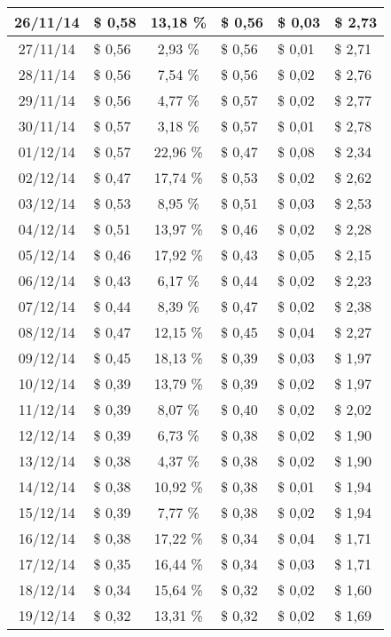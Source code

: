 \begin{center}
\begin{small}
\begin{longtable}{|c|l|c|l|l|l|}
26/11/14 & \$ 0,58 & 13,18 \% & \$ 0,56 & \$ 0,03 & \$ 2,73 \\ \hline
27/11/14 & \$ 0,56 & 2,93 \% & \$ 0,56 & \$ 0,01 & \$ 2,71 \\ \hline
28/11/14 & \$ 0,56 & 7,54 \% & \$ 0,56 & \$ 0,02 & \$ 2,76 \\ \hline
29/11/14 & \$ 0,56 & 4,77 \% & \$ 0,57 & \$ 0,02 & \$ 2,77 \\ \hline
30/11/14 & \$ 0,57 & 3,18 \% & \$ 0,57 & \$ 0,01 & \$ 2,78 \\ \hline
01/12/14 & \$ 0,57 & 22,96 \% & \$ 0,47 & \$ 0,08 & \$ 2,34 \\ \hline
02/12/14 & \$ 0,47 & 17,74 \% & \$ 0,53 & \$ 0,02 & \$ 2,62 \\ \hline
03/12/14 & \$ 0,53 & 8,95 \% & \$ 0,51 & \$ 0,03 & \$ 2,53 \\ \hline
04/12/14 & \$ 0,51 & 13,97 \% & \$ 0,46 & \$ 0,02 & \$ 2,28 \\ \hline
05/12/14 & \$ 0,46 & 17,92 \% & \$ 0,43 & \$ 0,05 & \$ 2,15 \\ \hline
06/12/14 & \$ 0,43 & 6,17 \% & \$ 0,44 & \$ 0,02 & \$ 2,23 \\ \hline
07/12/14 & \$ 0,44 & 8,39 \% & \$ 0,47 & \$ 0,02 & \$ 2,38 \\ \hline
08/12/14 & \$ 0,47 & 12,15 \% & \$ 0,45 & \$ 0,04 & \$ 2,27 \\ \hline
09/12/14 & \$ 0,45 & 18,13 \% & \$ 0,39 & \$ 0,03 & \$ 1,97 \\ \hline
10/12/14 & \$ 0,39 & 13,79 \% & \$ 0,39 & \$ 0,02 & \$ 1,97 \\ \hline
11/12/14 & \$ 0,39 & 8,07 \% & \$ 0,40 & \$ 0,02 & \$ 2,02 \\ \hline
12/12/14 & \$ 0,39 & 6,73 \% & \$ 0,38 & \$ 0,02 & \$ 1,90 \\ \hline
13/12/14 & \$ 0,38 & 4,37 \% & \$ 0,38 & \$ 0,02 & \$ 1,90 \\ \hline
14/12/14 & \$ 0,38 & 10,92 \% & \$ 0,38 & \$ 0,01 & \$ 1,94 \\ \hline
15/12/14 & \$ 0,39 & 7,77 \% & \$ 0,38 & \$ 0,02 & \$ 1,94 \\ \hline
16/12/14 & \$ 0,38 & 17,22 \% & \$ 0,34 & \$ 0,04 & \$ 1,71 \\ \hline
17/12/14 & \$ 0,35 & 16,44 \% & \$ 0,34 & \$ 0,03 & \$ 1,71 \\ \hline
18/12/14 & \$ 0,34 & 15,64 \% & \$ 0,32 & \$ 0,02 & \$ 1,60 \\ \hline
19/12/14 & \$ 0,32 & 13,31 \% & \$ 0,32 & \$ 0,02 & \$ 1,69 \\ \hline

\end{longtable}
\end{small}
\end{center}
